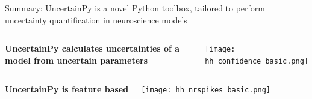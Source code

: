 \documentclass[presentation]{beamer}
\begin{document}
  \begin{frame}{Summary: UncertainPy is a novel Python toolbox, tailored to perform uncertainty quantification in neuroscience models}
\vspace{-10mm}
\begin{columns}

     \begin{center}
        \raggedright
      \bf{UncertainPy calculates uncertainties of a model from uncertain parameters}
     \end{center}
     \begin{center}
            \texttt{[image: hh\_confidence\_basic.png]}
     \end{center}

 \end{columns}

\vspace{5mm}

\begin{columns}
  \begin{center}
      \raggedright
   \bf{UncertainPy is feature based}
  \end{center}
     \begin{center}
            \texttt{[image: hh\_nrspikes\_basic.png]}
     \end{center}

 \end{columns}




\pause
{}



\end{frame}
\end{document}
